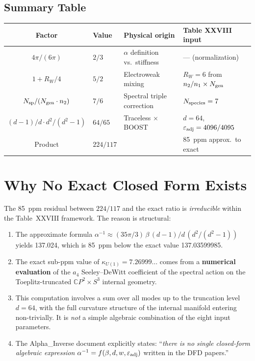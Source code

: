 \documentclass[12pt,a4paper]{article}
\begin{document}
\subsection{Summary Table}

\begin{center}
\renewcommand{\arraystretch}{1.3}
\begin{tabular}{clll}
\toprule
\textbf{Factor} & \textbf{Value} & \textbf{Physical origin} & \textbf{Table XXVIII input} \\
\midrule
$4\pi/(6\pi)$ & $2/3$ & $\alpha$ definition vs.\ stiffness & --- (normalization) \\
$1 + R_W/4$ & $5/2$ & Electroweak mixing & $R_W = 6$ from $n_2/n_1 \times N_{\rm gen}$ \\
$N_{\rm sp}/(N_{\rm gen}\cdot n_2)$ & $7/6$ & Spectral triple correction & $N_{\rm species} = 7$ \\
$(d{-}1)/d \cdot d^2/(d^2{-}1)$ & $64/65$ & Traceless $\times$ BOOST & $d = 64$, $\varepsilon_{\rm adj} = 4096/4095$ \\
\midrule
Product & $224/117$ & & 85~ppm approx.\ to exact \\
\bottomrule
\end{tabular}
\end{center}

\section{Why No Exact Closed Form Exists}

The 85~ppm residual between $224/117$ and the exact ratio is
\emph{irreducible} within the Table~XXVIII framework.  The reason is
structural:

\begin{enumerate}
\item The approximate formula $\alpha^{-1} \approx (35\pi/3)\,\beta\,
  (d{-}1)/d\,(d^2/(d^2{-}1))$ yields 137.024, which is 85~ppm below
  the exact value 137.03599985.

\item The exact sub-ppm value of $\kappa_{U(1)} = 7.26999\ldots$ comes
  from a \textbf{numerical evaluation} of the $a_4$ Seeley--DeWitt
  coefficient of the spectral action on the Toeplitz-truncated
  $\mathbb{C}P^2 \times S^3$ internal geometry.

\item This computation involves a sum over all modes up to the truncation
  level $d = 64$, with the full curvature structure of the internal
  manifold entering non-trivially.  It is \emph{not} a simple algebraic
  combination of the eight input parameters.

\item The Alpha\_Inverse document explicitly states:
  ``\emph{there is no single closed-form algebraic expression}
  $\alpha^{-1} = f(\beta, d, w, \varepsilon_{\rm adj})$
  written in the DFD papers.''
\end{enumerate}
\end{document}
